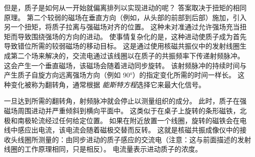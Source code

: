 但是，质子是如何从一开始就偏离排列以实现进动的呢？ 
答案取决于扭矩的相同原理。 
第二个较弱的磁场在垂直方向（例如，从头部的前部到后部）施加，引入另一个扭矩，将质子拉离与强磁场对齐的位置。
这种未对准通过允许强场充当扭矩而导致围绕强场的方向的进动。
使事情复杂化的是，这种进动使质子成为首先导致错位所需的较弱磁场的移动目标。
这是通过使用核磁共振仪中的发射线圈生成第二个场来解决的，交流电通过该线圈以在质子的共振频率下传递射频脉冲。
这会产生一个垂直磁场，该磁场会随着进动同步旋转。
该射频脉冲的持续时间与产生质子自旋方向远离强场方向（例如 90°）的指定变化所需的时间一样长。
这种变化被称为翻转角，通常根据 \textit{能斯特方程}选择它来最大化信号。


一旦达到所需的翻转角，射频脉冲就会停止以测量组织的成分。
此时，质子在强磁场周围进动并严重倾斜到横向平面中。
这类似于在桌子上旋转的条形磁铁，北极和南极轮流经过任何给定位置。
如果在附近放置一个线圈，旋转的磁铁会在电线中感应出电流，该电流会随着磁极交替而反转。
这就是核磁共振成像仪中的接收头线圈所测量的：由同步进动的质子感应的交流电（注意：这与前面描述的发射线圈的工作原理相同，只是相反）。
电流量表示进动质子的浓度。


